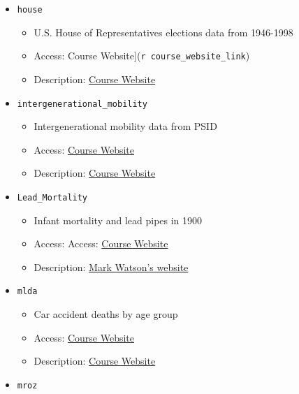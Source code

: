 \documentclass[
  letterpaper,
  DIV=11,
  numbers=noendperiod]{scrreprt}
\begin{document}
\begin{itemize}
  \begin{itemize}
  \item
    Country-level panel data from 1952-2007 about life expectancy, GDP
    per capita, and population
  \item
    Access: \texttt{data(gapminder,\ package="gapminder")}
  \item
    Description: \texttt{?gapminder::gapminder}
  \end{itemize}
\item
  \texttt{house}

  \begin{itemize}
  \item
    U.S. House of Representatives elections data from 1946-1998
  \item
    Access: Course Website{]}(\texttt{r\ course\_website\_link})
  \item
    Description: \href{\%60r\%20course_website_link\%60}{Course Website}
  \end{itemize}
\item
  \texttt{intergenerational\_mobility}

  \begin{itemize}
  \item
    Intergenerational mobility data from PSID
  \item
    Access: \href{\%60r\%20course_website_link\%60}{Course Website}
  \item
    Description: \href{\%60r\%20course_website_link\%60}{Course Website}
  \end{itemize}
\item
  \texttt{Lead\_Mortality}

  \begin{itemize}
  \item
    Infant mortality and lead pipes in 1900
  \item
    Access: Access: \href{\%60r\%20course_website_link\%60}{Course
    Website}
  \item
    Description:
    \href{http://www.princeton.edu/~mwatson/Stock-Watson_3u/Students/EE_Datasets/Lead_Mortality_Description.pdf}{Mark
    Watson's website}
  \end{itemize}
\item
  \texttt{mlda}

  \begin{itemize}
  \item
    Car accident deaths by age group
  \item
    Access: \href{\%60r\%20course_website_link\%60}{Course Website}
  \item
    Description: \href{\%60r\%20course_website_link\%60}{Course Website}
  \end{itemize}
\item
  \texttt{mroz}


\end{itemize}
\end{document}
